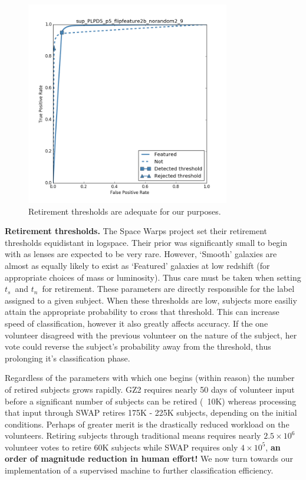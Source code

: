 \documentclass[twocolumn]{aastex6}
\newcommand{\ts}{$t_s$}
\newcommand{\tn}{$t_n$}
\begin{document}
\begin{figure}[t!]
\includegraphics[width=3.5in]{figures/GZX_ROC_sup_PLPD5_p5_flipfeature2b_norandom2_9.png}
\caption{Retirement thresholds are adequate for our purposes.  \label{fig: retirement thresholds}}
\end{figure}


\textbf{Retirement thresholds.}
The Space Warps project set their retirement thresholds equidistant in logspace. 
Their prior was significantly small to begin with as lenses are expected to be very rare.
However, `Smooth' galaxies are almost as equally likely to exist 
as `Featured' galaxies at low redshift (for appropriate choices of mass or luminosity). 
Thus care must be taken when setting \ts~and \tn~for retirement. 
These parameters are directly responsible for the label assigned to a given subject. 
When these thresholds are low, subjects more easiliy attain the appropriate 
probability to cross that threshold. This can increase speed of classification, however
it also greatly affects accuracy. If the one volunteer disagreed with the previous 
volunteer on the nature of the subject, her vote could reverse the subject's probability
away from the threshold, thus prolonging it's classification phase.  

Regardless of the parameters with which one begins (within reason) the number of 
retired subjects grows rapidly. GZ2 requires nearly 50 days of volunteer input before 
a significant number of subjects can be retired (~10K) whereas processing that input
through SWAP retires 175K - 225K subjects, depending on the initial conditions. 
Perhaps of greater merit is the drastically reduced workload on the volunteers. 
Retiring subjects through traditional means requires nearly $2.5\times10^6$ 
volunteer votes to retire 60K subjects while SWAP requires only $4\times10^5$, 
\textbf{an order of magnitude reduction in human effort!} We now turn towards
our implementation of a supervised machine to further classification efficiency. 
\end{document}
